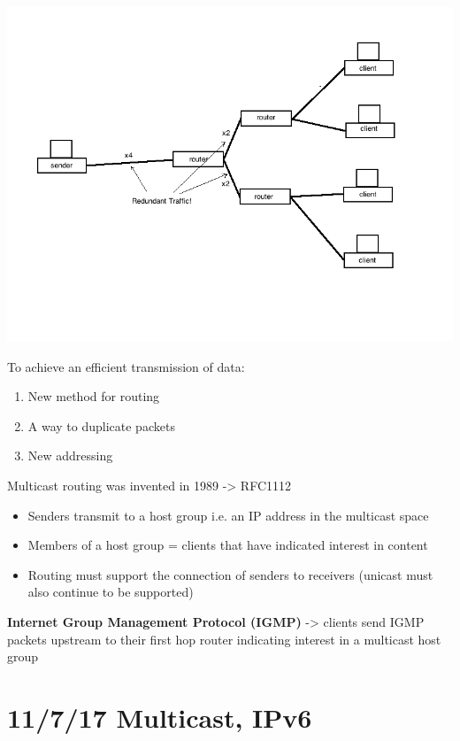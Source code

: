 \documentclass[11pt]{article}
\begin{document}
\includegraphics[width=.9\linewidth]{diagrams/multicast.png}

To achieve an efficient transmission of data:
\begin{enumerate}
\item New method for routing
\item A way to duplicate packets
\item New addressing
\end{enumerate}


Multicast routing was invented in 1989 -> RFC1112
\begin{itemize}
\item Senders transmit to a host group i.e. an IP address in the
multicast space
\item Members of a host group = clients that have indicated interest in content
\item Routing must support the connection of senders to receivers
(unicast must also continue to be supported)
\end{itemize}

\textbf{Internet Group Management Protocol (IGMP)} -> clients send IGMP packets
upstream to their first hop router indicating interest in a multicast
host group

\section{11/7/17  Multicast, IPv6}
\label{sec:orgheadline109}
\end{document}
